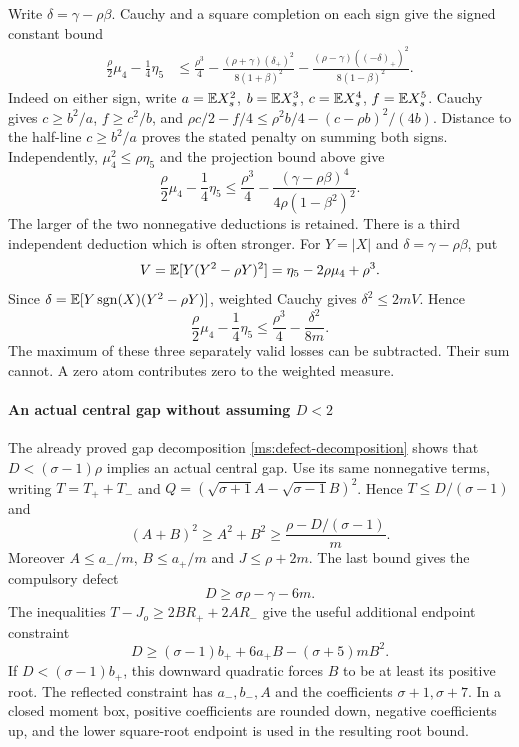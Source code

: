 Write $\delta=\gamma-\rho\beta$. Cauchy and a square completion on
each sign give the signed constant bound
\begin{align*}
 \frac\rho2\mu_4-\frac14\eta_5
 &\le\frac{\rho^3}{4}
 -\frac{(\rho+\gamma)(\delta_+)^2}{8(1+\beta)^2}
 -\frac{(\rho-\gamma)((-\delta)_+)^2}{8(1-\beta)^2}.
\end{align*}
Indeed on either sign, write $a=\mathbb E X_s^2$, $b=\mathbb E X_s^3$,
$c=\mathbb E X_s^4$, $f=\mathbb E X_s^5$. Cauchy gives $c\ge b^2/a$,
$f\ge c^2/b$, and
$\rho c/2-f/4\le\rho^2b/4-(c-\rho b)^2/(4b)$.
Distance to the half-line $c\ge b^2/a$ proves the stated penalty
on summing both signs. Independently,
$\mu_4^2\le\rho\eta_5$ and the projection bound above give
\[
 \frac\rho2\mu_4-\frac14\eta_5
 \le\frac{\rho^3}{4}
 -\frac{(\gamma-\rho\beta)^4}{4\rho(1-\beta^2)^2}.
\]
The larger of the two nonnegative deductions is retained.
There is a third independent deduction which is often stronger.
For $Y=|X|$ and $\delta=\gamma-\rho\beta$, put
\[
 V=\mathbb E[Y(Y^2-\rho Y)^2]=\eta_5-2\rho\mu_4+\rho^3.
\]
Since
$\delta=\mathbb E[Y\operatorname{sgn}(X)(Y^2-\rho Y)]$,
weighted Cauchy gives $\delta^2\le2mV$. Hence
\begin{equation}\label{ms:fourier:rescore:eq:weighted-constant-loss}
 \frac\rho2\mu_4-\frac14\eta_5
 \le\frac{\rho^3}{4}-\frac{\delta^2}{8m}.
\end{equation}
The maximum of these three separately valid losses can be subtracted.
Their sum cannot. A zero atom contributes zero to the weighted measure.

\paragraph{An actual central gap without assuming $D<2$}
The already proved gap decomposition \eqref{ms:defect-decomposition} shows that
$D<(\sigma-1)\rho$ implies an actual central gap. Use its same
nonnegative terms, writing $T=T_++T_-$ and
$Q=(\sqrt{\sigma+1}A-\sqrt{\sigma-1}B)^2$.
Hence $T\le D/(\sigma-1)$ and
\[
 (A+B)^2\ge A^2+B^2\ge\frac{\rho-D/(\sigma-1)}m.
\]
Moreover $A\le a_-/m$, $B\le a_+/m$ and $J\le\rho+2m$.
The last bound gives the compulsory defect
\[
 D\ge \sigma\rho-\gamma-6m.
\]
The inequalities $T-J_o\ge2BR_++2AR_-$ give the useful additional
endpoint constraint
\[
 D\ge(\sigma-1)b_++6a_+B-(\sigma+5)mB^2.
\]
If $D<(\sigma-1)b_+$, this downward quadratic forces $B$ to be at
least its positive root. The reflected constraint has $a_-,b_-,A$
and the coefficients $\sigma+1,\sigma+7$. In a closed moment box,
positive coefficients are rounded down, negative coefficients up, and
the lower square-root endpoint is used in the resulting root bound.

